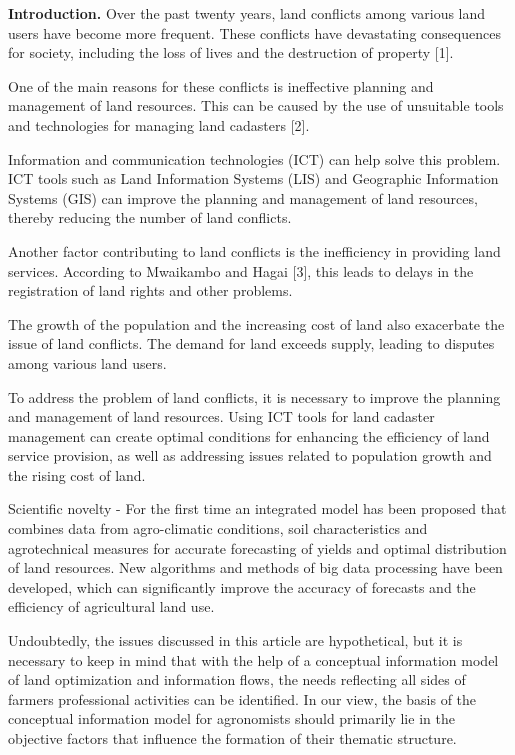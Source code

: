 \textbf{Introduction.} Over the past twenty years, land conflicts among
various land users have become more frequent. These conflicts have
devastating consequences for society, including the loss of lives and
the destruction of property {[}1{]}.

One of the main reasons for these conflicts is ineffective planning and
management of land resources. This can be caused by the use of
unsuitable tools and technologies for managing land cadasters {[}2{]}.

Information and communication technologies (ICT) can help solve this
problem. ICT tools such as Land Information Systems (LIS) and Geographic
Information Systems (GIS) can improve the planning and management of
land resources, thereby reducing the number of land conflicts.

Another factor contributing to land conflicts is the inefficiency in
providing land services. According to Mwaikambo and Hagai {[}3{]}, this
leads to delays in the registration of land rights and other problems.

The growth of the population and the increasing cost of land also
exacerbate the issue of land conflicts. The demand for land exceeds
supply, leading to disputes among various land users.

To address the problem of land conflicts, it is necessary to improve the
planning and management of land resources. Using ICT tools for land
cadaster management can create optimal conditions for enhancing the
efficiency of land service provision, as well as addressing issues
related to population growth and the rising cost of land.

Scientific novelty - For the first time an integrated model has been
proposed that combines data from agro-climatic conditions, soil
characteristics and agrotechnical measures for accurate forecasting of
yields and optimal distribution of land resources. New algorithms and
methods of big data processing have been developed, which can
significantly improve the accuracy of forecasts and the efficiency of
agricultural land use.

Undoubtedly, the issues discussed in this article are hypothetical, but
it is necessary to keep in mind that with the help of a conceptual
information model of land optimization and information flows, the needs
reflecting all sides of farmers\textquotesingle{} professional
activities can be identified. In our view, the basis of the conceptual
information model for agronomists should primarily lie in the objective
factors that influence the formation of their thematic structure.

